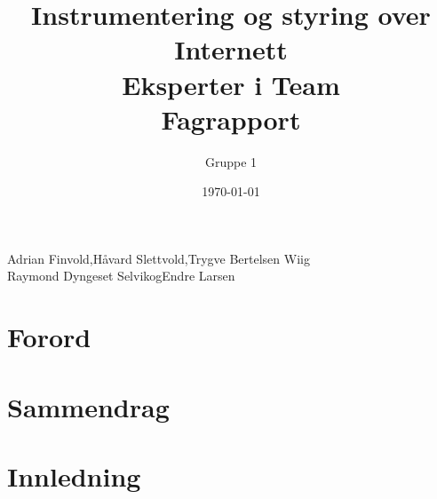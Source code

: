 \documentclass[a4paper, 11pt]{article}
\title{Instrumentering og styring over Internett\\Eksperter i Team\\Fagrapport}
\author{Gruppe 1}
\date{\today}
\newcommand{\HS}{Håvard Slettvold}
\newcommand{\AF}{Adrian Finvold}
\newcommand{\TW}{Trygve Bertelsen Wiig}
\newcommand{\RS}{Raymond Dyngeset Selvik}
\newcommand{\EL}{Endre Larsen}
\begin{document}
 

\thispagestyle{fancy} %

\maketitle 

\vspace*{\fill}
\begin{center}
\AF,\hspace{0.1cm}\HS,\hspace{0.1cm}\TW \\
\RS\hspace{0.1cm}og\hspace{0.1cm}\EL
\end{center}

\clearpage

 \newpage
\section*{Forord}

 \newpage
\section*{Sammendrag}


 \newpage

 \tableofcontents
\newpage


 \newpage
\section{Innledning}
\end{document}
